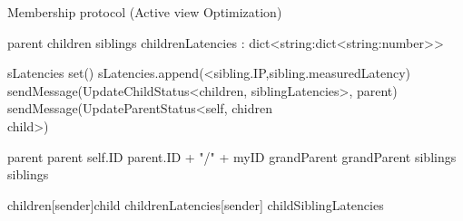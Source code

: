 \begin{algorithm}
    \caption{Membership protocol (Active view Optimization)} \label{alg:memb:active_view_maint}
    \begin{algorithmic}[1]
        \asdstate
            \State parent  \label{alg:memb:active_view_maint:state_start}
            \State children  
            \State siblings  
            \State childrenLatencies : dict<string:dict<string:number>> \label{alg:memb:active_view_maint:state_end} 
        \asdend

         \label{alg:memb:active_view_maint:update}
                \State sLatencies \asdassign set()
                    \State sLatencies.append(<sibling.IP,sibling.measuredLatency)
                \EndFor
                \State sendMessage(UpdateChildStatus<children, siblingLatencies>, parent)
            \EndIf
                \State sendMessage(UpdateParentStatus<self, chidren \\ child>)
            \EndFor
        \asdend \label{alg:memb:active_view_maint:update_end}

        \label{alg:memb:active_view_maint:update_recv_par}
                \State parent \asdassign parent
                \State self.ID \asdassign parent.ID + "/" + myID
                \State grandParent \asdassign grandParent
                \State siblings \asdassign siblings
            \EndIf
        \asdend

        \label{alg:memb:active_view_maint:update_recv_chi}
                \State children[sender]\asdassign child
                \State childrenLatencies[sender] \asdassign childSiblingLatencies
            \EndIf
        \asdend
    
    

\end{algorithmic}
\end{algorithm}
